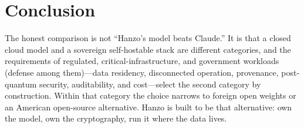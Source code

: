 \documentclass[11pt,letterpaper]{article}
\begin{document}
\section{Conclusion}

The honest comparison is not ``Hanzo's model beats Claude.'' It is that a closed
cloud model and a sovereign self-hostable stack are different categories, and the
requirements of regulated, critical-infrastructure, and government workloads
(defense among them)---data residency, disconnected
operation, provenance, post-quantum security, auditability, and cost---select the
second category by construction. Within that category the choice narrows to
foreign open weights or an American open-source alternative. Hanzo is built to be
that alternative: own the model, own the cryptography, run it where the data
lives.
\end{document}
